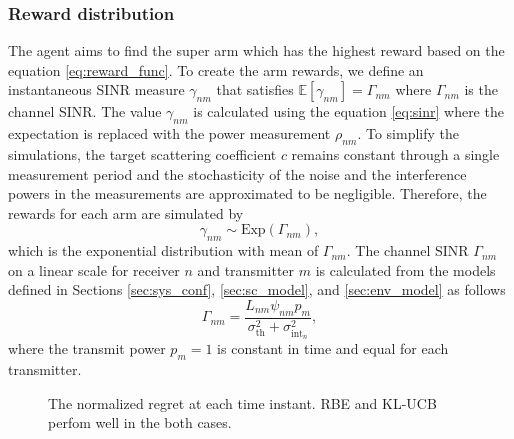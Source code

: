 \documentclass[english, 12pt, a4paper, elec, utf8, a-1b, online]{aaltothesis}
\newcommand{\E}[1]{\mathbb{E}\left[ #1 \right]}
\newcommand{\thnoise}{\sigma^2_{\text{th}}}
\newcommand{\epower}{p_{m}}
\newcommand{\eintnoise}{\sigma^2_{\text{int}_{n}}}
\newcommand{\esinr}{\gamma_{{nm}}}
\newcommand{\esinrexp}{\Gamma_{nm}}
\newcommand{\epl}{L_{nm}}
\newcommand{\ercs}{\psi_{nm}}
\newcommand{\esp}{\rho_{nm}}
\begin{document}
\subsubsection{Reward distribution}

The agent aims to find the super arm which has the highest reward based on the equation \eqref{eq:reward_func}. 
To create the arm rewards, we define an instantaneous SINR measure $\esinr$ that satisfies $\E{\esinr} = \esinrexp$ where $\esinrexp$ is the channel SINR. 
The value $\esinr$ is calculated using the equation \eqref{eq:sinr} where the expectation is replaced with the power measurement $\esp$. 
To simplify the simulations, 
the target scattering coefficient $c$ remains constant through a single measurement period and the stochasticity of the noise and the interference powers in the measurements are approximated to be negligible. 
Therefore, the rewards for each arm are simulated by
\begin{equation}
    \esinr  \sim \text{Exp}\left(\esinrexp\right),
\end{equation}
which is the exponential distribution with mean of $\esinrexp$.
The channel SINR $\esinrexp$ on a linear scale for receiver $n$ and transmitter $m$ is calculated from the models defined in Sections \ref{sec:sys_conf}, \ref{sec:sc_model}, and \ref{sec:env_model} as follows
\begin{equation}
    \esinrexp = \frac{\epl \ercs \epower}{\thnoise + \eintnoise},
\end{equation}
where the transmit power $\epower=1$ is constant in time and equal for each transmitter.


\begin{figure}[!tb]\centering
    \hfill
    \caption{The normalized regret at each time instant. 
            RBE and KL-UCB perfom well in the both cases.}
    \label{fig:regret}
\end{figure}
\end{document}

